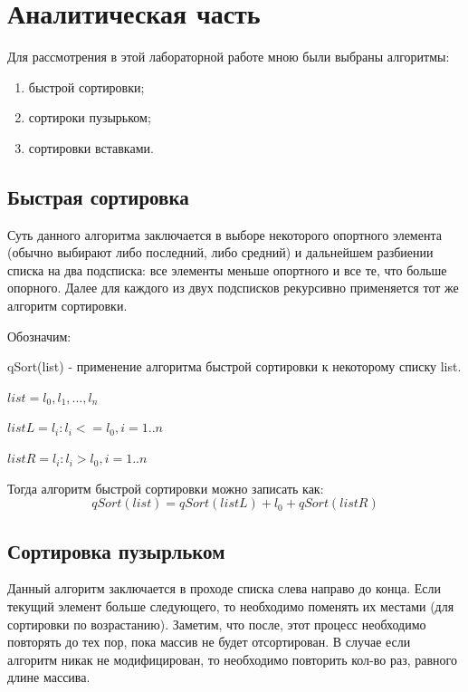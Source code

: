 \documentclass[12pt]{report}
\begin{document}
\chapter{Аналитическая часть}

	Для рассмотрения в этой лабораторной работе мною были выбраны алгоритмы:
\begin{enumerate}
	\item быстрой сортировки;
	\item сортироки пузырьком;
	\item сортировки вставками.
\end{enumerate}

\section{Быстрая сортировка}
	

	Суть данного алгоритма заключается в выборе некоторого опортного элемента (обычно выбирают либо последний, либо средний) и дальнейшем разбиении списка на два подсписка: все элементы меньше опортного и все те, что больше опорного. Далее для каждого из двух подсписков рекурсивно применяется тот же алгоритм сортировки.

Обозначим: 

{ qSort(list) - применение алгоритма быстрой сортировки к некоторому списку list.  }

{$ list = l_{0}, l_{1}, ... , l_{n}  $}

{$ listL =  l_{i} :  l_{i} <=  l_{0}, i = 1..n  $}

{$ listR = l_{i} :  l_{i} >  l_{0}, i = 1..n  $}


Тогда алгоритм быстрой сортировки можно записать как:
\begin{equation}
	qSort(list) = qSort(listL) + l_{0} + qSort(listR)
\end{equation}

\section{Сортировка пузырльком}

	Данный алгоритм заключается в проходе списка слева направо до конца. Если текущий элемент больше следующего, то необходимо поменять их местами (для сортировки по возрастанию). Заметим, что после, этот процесс необходимо повторять до тех пор, пока массив не будет отсортирован. В случае если алгоритм никак не модифицирован, то необходимо повторить кол-во раз, равного длине массива.
\end{document}
